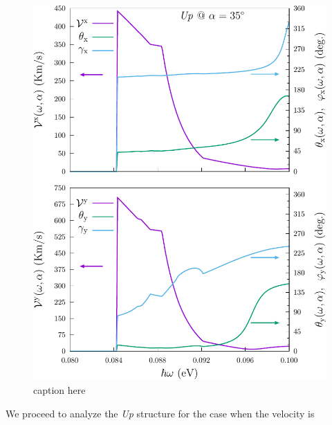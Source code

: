 \documentclass[prb,11pt,tightenlines,twocolumn,aps]{revtex4-1}
\begin{document}
\begin{figure}[t]
    \centering
    \includegraphics[width=\linewidth]{upplots/up-vx-vy-w1}
    \caption{caption here}
    \label{fig:up-vab-comp-rtp-1}
\end{figure}
We proceed to analyze the \emph{Up} structure for the case when the velocity is
\end{document}
